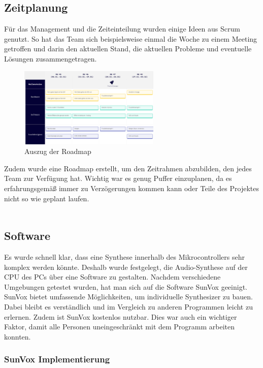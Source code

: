 \documentclass[12pt]{scrartcl}%
\theoremstyle{nonumberplain}
\begin{document}
\subsection{Zeitplanung}

Für das Management und die Zeiteinteilung wurden einige Ideen aus Scrum genutzt. So hat das Team sich beispielsweise einmal die Woche zu einem Meeting getroffen und darin den aktuellen Stand, die aktuellen Probleme und eventuelle Lösungen zusammengetragen.
\begin{figure}
  \centering
  \includegraphics[width=0.6\textwidth]{road1}
  \caption{Auszug der Roadmap}
\end{figure}

\noindent Zudem wurde eine Roadmap erstellt, um den Zeitrahmen abzubilden, den jedes Team zur Verfügung hat. Wichtig war es genug Puffer einzuplanen, da es erfahrungsgemäß immer zu Verzögerungen kommen kann oder Teile des Projektes nicht so wie geplant laufen.
\\\\

\newpage

\subsection{Software}

Es wurde schnell klar, dass eine Synthese innerhalb des Mikrocontrollers sehr komplex werden könnte. Deshalb wurde festgelegt, die Audio-Synthese auf der CPU des PCs über eine Software zu gestalten. Nachdem verschiedene Umgebungen getestet wurden, hat man sich auf die Software SunVox geeinigt.\\
SunVox bietet umfassende Möglichkeiten, um individuelle Synthesizer zu bauen. Dabei bleibt es verständlich und im Vergleich zu anderen Programmen leicht zu erlernen. Zudem ist SunVox kostenlos nutzbar. Dies war auch ein wichtiger Faktor, damit alle Personen uneingeschränkt mit dem Programm arbeiten konnten.

\subsubsection{SunVox Implementierung}
\end{document}
